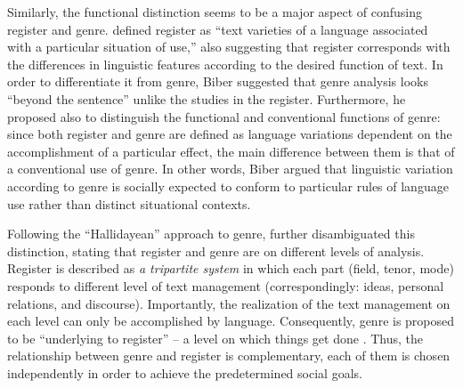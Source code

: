 \documentclass[12pt]{article}
\begin{document}
Similarly, the functional distinction seems to be a major aspect of confusing register and genre. \textcite[p. 191]{biber2012} defined register as ``text varieties of a language associated with a particular situation of use,'' also suggesting that register corresponds with the differences in linguistic features according to the desired function of text. In order to differentiate it from genre, Biber suggested that genre analysis looks ``beyond the sentence'' unlike the studies in the register. Furthermore, he proposed also to distinguish the functional and conventional functions of genre: since both register and genre are defined as language variations dependent on the accomplishment of a particular effect, the main difference between them is that of a conventional use of genre. In other words, Biber argued that linguistic variation according to genre is socially expected to conform to particular rules of language use rather than distinct situational contexts. 

Following the ``Hallidayean'' approach to genre, \textcite{swales1990} further disambiguated this distinction, stating that register and genre are on different levels of analysis. Register is described as \textit{a tripartite system} in which each part (field, tenor, mode) responds to different level of text management (correspondingly: ideas, personal relations, and discourse). Importantly, the realization of the text management on each level can only be accomplished by language. Consequently, genre is proposed to be ``underlying to register'' -- a level on which things get done \parencite[p. 40]{swales1990}. Thus, the relationship between genre and register is complementary, each of them is chosen independently in order to achieve the predetermined social goals.
\end{document}
